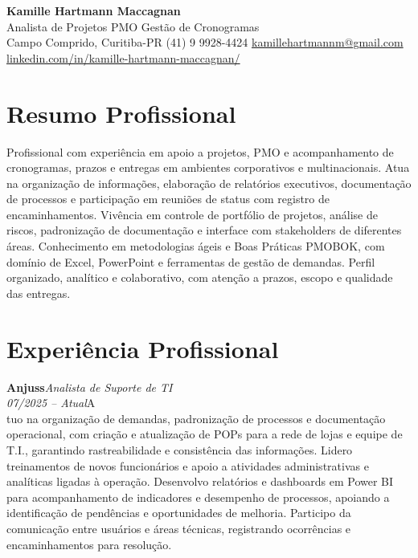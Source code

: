 \documentclass[11pt,a4paper]{article}
\newcommand{\cvrole}[4]{%
  \vspace{4pt}%
  {\bfseries\color{accentcolor}#1}\hfill{\itshape #2}\\[-2pt]%
  {\itshape #3}\hfill #4\\[6pt]%
}
\begin{document}
\begin{center}
  {\fontsize{20}{24}\selectfont\bfseries Kamille Hartmann Maccagnan}\\[8pt]
  {\large Analista de Projetos \textbar{} PMO \textbar{} Gestão de Cronogramas}\\[10pt]
  Campo Comprido, Curitiba-PR \enspace\textbullet\enspace (41) 9 9928-4424 \enspace\textbullet\enspace
  \href{mailto:kamillehartmannm@gmail.com}{kamillehartmannm@gmail.com}\\[3pt]
  \href{https://linkedin.com/in/kamille-hartmann-maccagnan/}{linkedin.com/in/kamille-hartmann-maccagnan/}
\end{center}

\vspace{6pt}

\section{Resumo Profissional}

Profissional com experiência em apoio a projetos, PMO e acompanhamento de cronogramas, prazos e entregas em ambientes corporativos e multinacionais. Atua na organização de informações, elaboração de relatórios executivos, documentação de processos e participação em reuniões de status com registro de encaminhamentos. Vivência em controle de portfólio de projetos, análise de riscos, padronização de documentação e interface com stakeholders de diferentes áreas. Conhecimento em metodologias ágeis e Boas Práticas PMOBOK, com domínio de Excel, PowerPoint e ferramentas de gestão de demandas. Perfil organizado, analítico e colaborativo, com atenção a prazos, escopo e qualidade das entregas.

\section{Experiência Profissional}

\cvrole{Anjuss}{Analista de Suporte de TI}{07/2025 -- Atual}

Atuo na organização de demandas, padronização de processos e documentação operacional, com criação e atualização de POPs para a rede de lojas e equipe de T.I., garantindo rastreabilidade e consistência das informações. Lidero treinamentos de novos funcionários e apoio a atividades administrativas e analíticas ligadas à operação. Desenvolvo relatórios e dashboards em Power BI para acompanhamento de indicadores e desempenho de processos, apoiando a identificação de pendências e oportunidades de melhoria. Participo da comunicação entre usuários e áreas técnicas, registrando ocorrências e encaminhamentos para resolução.
\end{document}
